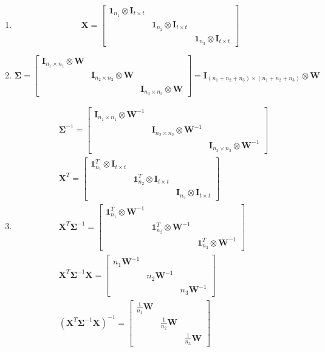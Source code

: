 \documentclass{article}
\begin{document}
\begin{enumerate}[leftmargin = 0 em, label = \arabic*., font = \bfseries]
\begin{enumerate}
		\item 
		\[\bm X = \begin{bmatrix}
			\bm 1_{n_1} \otimes \bm I_{t\times t} &\\
			&\bm 1_{n_2} \otimes \bm I_{t\times t} \\
			&& \bm 1_{n_3} \otimes \bm I_{t\times t}
		\end{bmatrix}\]

		\item 
		\[\bm \Sigma = \begin{bmatrix}
			\bm I_{n_1 \times n_1} \otimes \bm W&\\
			&\bm I_{n_2  \times n_2} \otimes \bm W\\
			&& \bm I_{n_3 \times n_3} \otimes \bm W
		\end{bmatrix} = 
			\bm I_{(n_1 + n_2 + n_3) \times (n_1 + n_2 + n_3)} \otimes \bm W
		\]

		\item 
		\begin{align*}
		& \bm \Sigma^{-1} = \begin{bmatrix}
			\bm I_{n_1 \times n_1} \otimes \bm W^{-1} & \\
			& \bm I_{n_2 \times n_2} \otimes \bm W^{-1}\\
			&& \bm I_{n_3 \times n_3} \otimes \bm W^{-1}
		\end{bmatrix}\\
		& \bm X^{T} = \begin{bmatrix}
			\bm 1_{n_1}^T \otimes \bm I_{t \times t}&\\
			& \bm 1_{n_2}^T \otimes \bm I_{t\times t}\\
			&& \bm I_{n_3} \otimes \bm I_{t\times t}
		\end{bmatrix}\\
		& \bm X^{T} \bm \Sigma^{-1} = \begin{bmatrix}
			\bm 1_{n_1}^T \otimes \bm W^{-1}\\
			&\bm 1_{n_2}^T \otimes \bm W^{-1}\\
			&& \bm 1_{n_3}^T \otimes \bm W^{-1}
		\end{bmatrix}\\
		& \bm X^T \bm \Sigma^{-1} \bm X = \begin{bmatrix}
			n_1 \bm W^{-1}\\
			& n_2 \bm W^{-1}\\
			&& n_3 \bm W^{-1}
		\end{bmatrix}\\
		& (\bm X^T \bm \Sigma^{-1} \bm X)^{-1} = \begin{bmatrix}
			\frac{1}{n_1} \bm W \\
			& \frac{1}{n_2} \bm W\\
			&& \frac{1}{n_3} \bm W
		\end{bmatrix}
		\end{align*}


\end{enumerate}
\end{enumerate}
\end{document}
